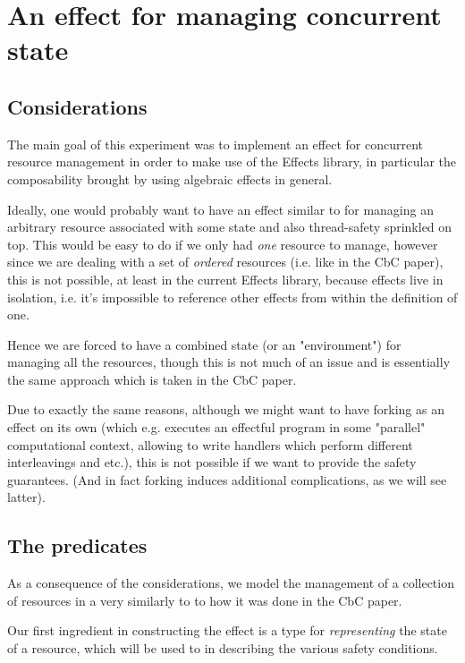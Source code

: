 \section{An effect for managing concurrent state}

\subsection{Considerations}

The main goal of this experiment was to implement an effect for concurrent
resource management in order to make use of the Effects library, in particular
the composability brought by using algebraic effects in general.

Ideally, one would probably want to have an effect similar to 
for managing an arbitrary resource associated with some state and also
thread-safety sprinkled on top. This would be easy to do if we only had
\emph{one} resource to manage, however since we are dealing with a set of
\emph{ordered} resources (i.e. like in the CbC paper), this is not possible, at
least in the current Effects library, because effects live in isolation, i.e.
it's impossible to reference other effects from within the definition of one.

Hence we are forced to have a combined state (or an "environment") for managing
all the resources, though this is not much of an issue and is essentially the
same approach which is taken in the CbC paper.

Due to exactly the same reasons, although we might want to have forking as an
effect on its own (which e.g. executes an effectful program in some "parallel"
computational context, allowing to write handlers which perform different
interleavings and etc.), this is not possible if we want to provide the safety
guarantees. (And in fact forking induces additional complications, as we will
see latter).

\subsection{The predicates}

As a consequence of the considerations, we model the management of a collection
of resources in a very similarly to to how it was done in the CbC paper.

Our first ingredient in constructing the effect is a type for
\emph{representing} the state of a resource, which will be used to in
describing the various safety conditions.

